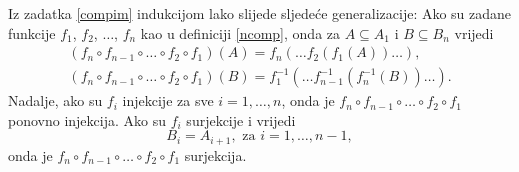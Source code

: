 \begin{remark}
\label{ncomprem}
Iz zadatka \ref{compim} indukcijom lako slijede sljedeće generalizacije: Ako su zadane funkcije \(f_1\), \(f_2\), \(\dots\), \(f_n\) kao u definiciji \ref{ncomp}, onda za \(A\subseteq A_1\) i \(B\subseteq B_n\) vrijedi
\begin{gather*}
(f_n\circ f_{n-1}\circ\dots\circ f_2\circ f_1)(A)=f_n(\dots f_2(f_1(A))\dots),\\
(f_n\circ f_{n-1}\circ\dots\circ f_2\circ f_1)(B)=f_1^{-1}(\dots f_{n-1}^{-1}(f_n^{-1}(B))\dots).
\end{gather*}
Nadalje, ako su \(f_i\) injekcije za sve \(i=1, \dots, n\), onda je \(f_n\circ f_{n-1}\circ\dots\circ f_2\circ f_1\) ponovno injekcija. Ako su \(f_i\) surjekcije i vrijedi
\[B_i=A_{i+1},\text{ za }i=1,\dots, n-1,\]
onda je \(f_n\circ f_{n-1}\circ\dots\circ f_2\circ f_1\) surjekcija.
\end{remark}

